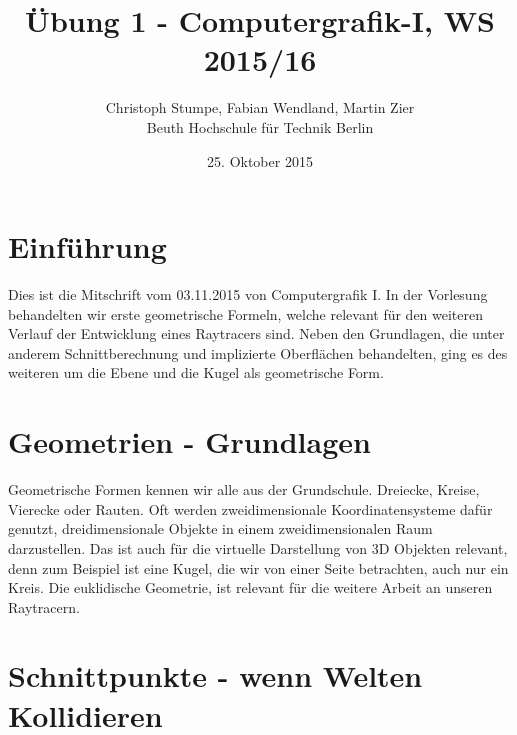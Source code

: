 \documentclass[tog]{acmsiggraph}
\title{Übung 1 - Computergrafik-I, WS 2015/16}
\author{Christoph Stumpe, Fabian Wendland, Martin Zier\\Beuth Hochschule für Technik Berlin}
\date{25. Oktober 2015}
\begin{document}
\iffalse
 \teaser{
   \texttt{[image: 01\_image-frame.png]}
   \caption{Vorbereitungsübung 1 -- Quelle: \textsc{Ghost in the Shell}, 1996}
 }
\maketitle
\fi
\tableofcontents
\newpage

\section{Einführung}
Dies ist die Mitschrift vom 03.11.2015 von Computergrafik I. In der Vorlesung behandelten wir erste geometrische Formeln, welche relevant für den weiteren Verlauf der Entwicklung eines Raytracers sind. Neben den Grundlagen, die unter anderem Schnittberechnung und implizierte Oberflächen behandelten, ging es des weiteren um die Ebene und die Kugel als geometrische Form. 

\section{Geometrien - Grundlagen}
Geometrische Formen kennen wir alle aus der Grundschule. Dreiecke, Kreise, Vierecke oder Rauten. Oft werden zweidimensionale Koordinatensysteme dafür genutzt, dreidimensionale Objekte in einem zweidimensionalen Raum darzustellen. Das ist auch für die virtuelle Darstellung von 3D Objekten relevant, denn zum Beispiel ist eine Kugel, die wir von einer Seite betrachten, auch nur ein Kreis. Die euklidische Geometrie, ist relevant für die weitere Arbeit an unseren Raytracern.

\section{Schnittpunkte - wenn Welten Kollidieren}
\end{document}
